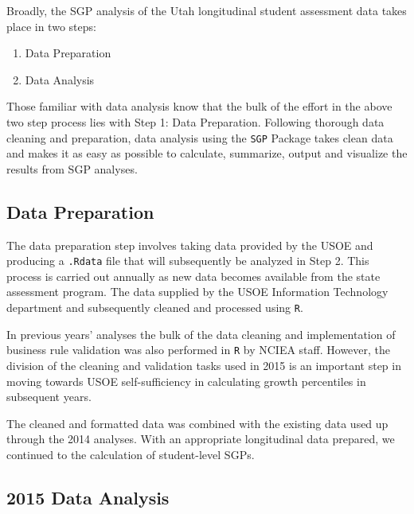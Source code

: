 \documentclass[12pt]{article}
\begin{document}
Broadly, the SGP analysis of the Utah longitudinal student assessment
data takes place in two steps:

\begin{enumerate}
\def\labelenumi{\arabic{enumi}.}
\itemsep1pt\parskip0pt
\item
  Data Preparation
\item
  Data Analysis
\end{enumerate}

Those familiar with data analysis know that the bulk of the effort in
the above two step process lies with Step 1: Data Preparation. Following
thorough data cleaning and preparation, data analysis using the
\texttt{SGP} Package takes clean data and makes it as easy as possible
to calculate, summarize, output and visualize the results from SGP
analyses.

\subsection{Data Preparation}\label{data-preparation}

The data preparation step involves taking data provided by the USOE and
producing a \texttt{.Rdata} file that will subsequently be analyzed in
Step 2. This process is carried out annually as new data becomes
available from the state assessment program. The data supplied by the
USOE Information Technology department and subsequently cleaned and
processed using \texttt{R}.

In previous years' analyses the bulk of the data cleaning and
implementation of business rule validation was also performed in
\texttt{R} by NCIEA staff. However, the division of the cleaning and
validation tasks used in 2015 is an important step in moving towards
USOE self-sufficiency in calculating growth percentiles in subsequent
years.

The cleaned and formatted data was combined with the existing data used
up through the 2014 analyses. With an appropriate longitudinal data
prepared, we continued to the calculation of student-level SGPs.

\subsection{2015 Data Analysis}\label{data-analysis}
\end{document}
